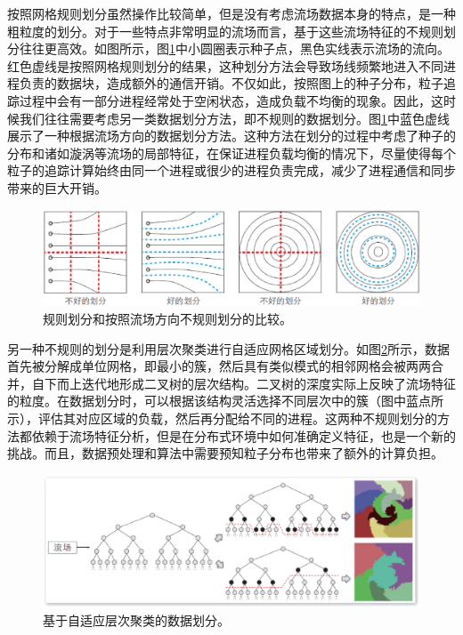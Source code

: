 按照网格规则划分虽然操作比较简单，但是没有考虑流场数据本身的特点，是一种粗粒度的划分。对于一些特点非常明显的流场而言，基于这些流场特征的不规则划分往往更高效。如图所示，图\ref{fig:loadbalance:flowdirection}中小圆圈表示种子点，黑色实线表示流场的流向。红色虚线是按照网格规则划分的结果，这种划分方法会导致场线频繁地进入不同进程负责的数据块，造成额外的通信开销。不仅如此，按照图上的种子分布，粒子追踪过程中会有一部分进程经常处于空闲状态，造成负载不均衡的现象。因此，这时候我们往往需要考虑另一类数据划分方法，即不规则的数据划分。图\ref{fig:loadbalance:flowdirection}中蓝色虚线展示了一种根据流场方向的数据划分方法\parencite{ChenF08}。这种方法在划分的过程中考虑了种子的分布和诸如漩涡等流场的局部特征，在保证进程负载均衡的情况下，尽量使得每个粒子的追踪计算始终由同一个进程或很少的进程负责完成，减少了进程通信和同步带来的巨大开销。

\begin{figure}[!tb]
  \centering
  \includegraphics[width=.9\linewidth,keepaspectratio]{image/loadbalance/flowdirection.eps}
  \caption{
    规则划分和按照流场方向不规则划分的比较\parencite{ChenF08}。
 }
\label{fig:loadbalance:flowdirection}
\end{figure}

另一种不规则的划分是利用层次聚类进行自适应网格区域划分\parencite{YuWM07}。如图\ref{fig:loadbalance:hierarchical_partition}所示，数据首先被分解成单位网格，即最小的簇，然后具有类似模式的相邻网格会被两两合并，自下而上迭代地形成二叉树的层次结构。二叉树的深度实际上反映了流场特征的粒度。在数据划分时，可以根据该结构灵活选择不同层次中的簇（图中蓝点所示），评估其对应区域的负载，然后再分配给不同的进程。这两种不规则划分的方法都依赖于流场特征分析，但是在分布式环境中如何准确定义特征，也是一个新的挑战。而且，数据预处理和算法中需要预知粒子分布也带来了额外的计算负担。

\begin{figure}[!tb]
  \centering
  \includegraphics[width=\linewidth,keepaspectratio]{image/loadbalance/hierarchical_partition.eps}
  \caption{
    基于自适应层次聚类的数据划分\parencite{YuWM07}。
 }
\label{fig:loadbalance:hierarchical_partition}
\end{figure}

